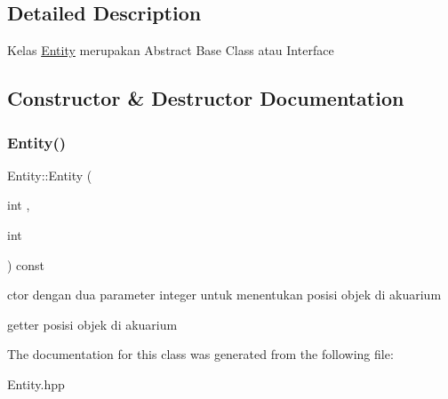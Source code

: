 \subsection{Detailed Description}
Kelas \hyperlink{classEntity}{Entity} merupakan Abstract Base Class atau Interface 

\subsection{Constructor \& Destructor Documentation}
\mbox{\label{classEntity_a82c4f38635d70e83cbf17332e2abddc6}} 
\subsubsection{\texorpdfstring{Entity()}{Entity()}}
{\footnotesize\ttfamily Entity\+::\+Entity (\begin{DoxyParamCaption}\item[{int}]{,  }\item[{int}]{ }\end{DoxyParamCaption}) const}



ctor dengan dua parameter integer untuk menentukan posisi objek di akuarium 

getter posisi objek di akuarium 

The documentation for this class was generated from the following file\+:\begin{DoxyCompactItemize}
\item 
Entity.\+hpp\end{DoxyCompactItemize}
